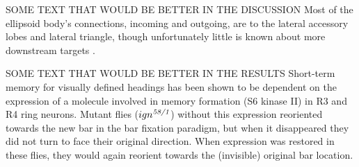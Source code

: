 SOME TEXT THAT WOULD BE BETTER IN THE DISCUSSION
Most of the ellipsoid body's connections, incoming and outgoing, are to the lateral accessory lobes and lateral triangle, though unfortunately little is known about more downstream targets \cite{Pfeiffer2014,Young2010}.


SOME TEXT THAT WOULD BE BETTER IN THE RESULTS
Short-term memory for visually defined headings has been shown to be dependent on the expression of a molecule involved in memory formation (S6 kinase II) in R3 and R4 ring neurons.
Mutant flies ($ign^{\emph{58/1}}$) without this expression reoriented towards the new bar in the bar fixation paradigm, but when it disappeared they did not turn to face their original direction.
When expression was restored in these flies, they would again reorient towards the (invisible) original bar location.

